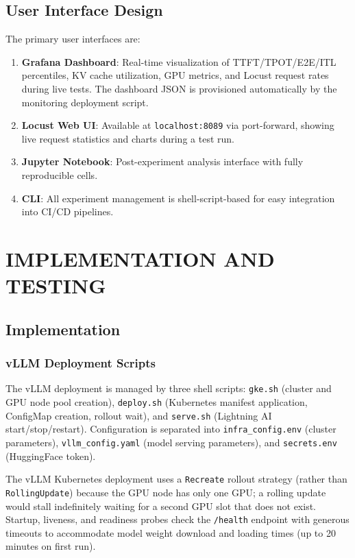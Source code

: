 \documentclass[a4paper,12pt]{report}
\begin{document}
\section{User Interface Design}

The primary user interfaces are:

\begin{enumerate}
    \item \textbf{Grafana Dashboard}: Real-time visualization of TTFT/TPOT/E2E/ITL percentiles, KV cache utilization, GPU metrics, and Locust request rates during live tests. The dashboard JSON is provisioned automatically by the monitoring deployment script.
    \item \textbf{Locust Web UI}: Available at \texttt{localhost:8089} via port-forward, showing live request statistics and charts during a test run.
    \item \textbf{Jupyter Notebook}: Post-experiment analysis interface with fully reproducible cells.
    \item \textbf{CLI}: All experiment management is shell-script-based for easy integration into CI/CD pipelines.
\end{enumerate}

\chapter{IMPLEMENTATION AND TESTING}

\section{Implementation}

\subsection{vLLM Deployment Scripts}

The vLLM deployment is managed by three shell scripts: \texttt{gke.sh} (cluster and GPU node pool creation), \texttt{deploy.sh} (Kubernetes manifest application, ConfigMap creation, rollout wait), and \texttt{serve.sh} (Lightning AI start/stop/restart). Configuration is separated into \texttt{infra\_config.env} (cluster parameters), \texttt{vllm\_config.yaml} (model serving parameters), and \texttt{secrets.env} (HuggingFace token).

The vLLM Kubernetes deployment uses a \texttt{Recreate} rollout strategy (rather than \texttt{RollingUpdate}) because the GPU node has only one GPU; a rolling update would stall indefinitely waiting for a second GPU slot that does not exist. Startup, liveness, and readiness probes check the \texttt{/health} endpoint with generous timeouts to accommodate model weight download and loading times (up to 20 minutes on first run).
\end{document}

